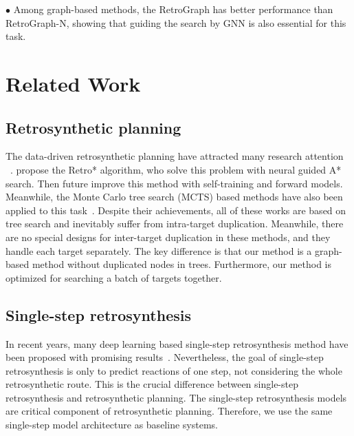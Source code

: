 \documentclass[sigconf]{acmart}
\begin{document}
\noindent$\bullet$ Among graph-based methods, the RetroGraph has better performance than RetroGraph-N, showing that guiding the search by GNN is also essential for this task.



\section{Related Work}
\subsection{Retrosynthetic planning}
The data-driven retrosynthetic planning have attracted many research attention ~\cite{Chen2020,Kim2021,Dong2021,Finnigan2021,Jeong2021,segler2018planning,Schreck2019,Wang2020,Hong2021,han2022gnn}.
\citet{Chen2020} propose the Retro* algorithm, who solve this problem with neural guided A* search.
Then \citet{Kim2021} future improve this method with self-training and forward models.
Meanwhile, the Monte Carlo tree search (MCTS) based methods have also been applied to this task~\citep{segler2018planning,Schreck2019,Wang2020,Hong2021}.
Despite their achievements, all of these works are based on tree search and inevitably suffer from intra-target duplication.
Meanwhile, there are no special designs for inter-target duplication in these methods, and they handle each target separately.
The key difference is that our method is a graph-based method without duplicated nodes in trees.
Furthermore, our method is optimized for searching a batch of targets together.


\subsection{Single-step retrosynthesis}
In recent years, many deep learning based single-step retrosynthesis method have been proposed with promising results~\citep{segler2017towards,dai2020retrosynthesis,Chen2021,yan2020retroxpert,somnath2020learning,shi2020graph,yang2021}.
Nevertheless, the goal of single-step retrosynthesis is only to predict reactions of one step, not considering the whole retrosynthetic route.
This is the crucial difference between single-step retrosynthesis and retrosynthetic planning.
The single-step retrosynthesis models are critical component of retrosynthetic planning.
Therefore, we use the same single-step model architecture as baseline systems.
\end{document}
